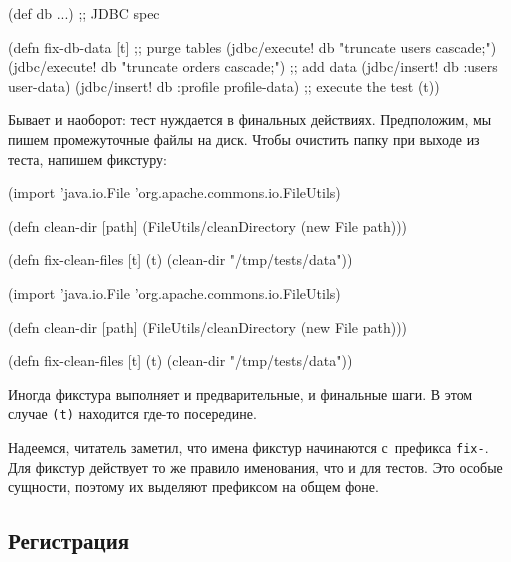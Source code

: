 \else

\begin{english}
  \begin{clojure}
(def db {...}) ;; JDBC spec

(defn fix-db-data [t]
  ;; purge tables
  (jdbc/execute! db "truncate users cascade;")
  (jdbc/execute! db "truncate orders cascade;")
  ;; add data
  (jdbc/insert! db :users user-data)
  (jdbc/insert! db :profile profile-data)
  ;; execute the test
  (t))
  \end{clojure}
\end{english}

\fi

Бывает и наоборот: тест нуждается в финальных действиях. Предположим, мы пишем
промежуточные файлы на диск. Чтобы очистить папку при выходе из теста, напишем
фикстуру:

\ifnarrow

\begin{english}
  \begin{clojure}
(import 'java.io.File
        'org.apache.commons.io.FileUtils)

(defn clean-dir [path]
  (FileUtils/cleanDirectory
    (new File path)))

(defn fix-clean-files [t]
  (t)
  (clean-dir "/tmp/tests/data"))
  \end{clojure}
\end{english}

\else

\begin{english}
  \begin{clojure}
(import 'java.io.File
        'org.apache.commons.io.FileUtils)

(defn clean-dir [path]
  (FileUtils/cleanDirectory (new File path)))

(defn fix-clean-files [t]
  (t)
  (clean-dir "/tmp/tests/data"))
  \end{clojure}
\end{english}

\fi

Иногда фикстура выполняет и предварительные, и финальные шаги. В этом случае
\verb|(t)| находится где-то посередине.

Надеемся, читатель заметил, что имена фикстур начинаются с~префикса
\verb|fix-|. Для фикстур действует то же правило именования, что и для
тестов. Это особые сущности, поэтому их выделяют префиксом на общем фоне.

\subsection{Регистрация}

